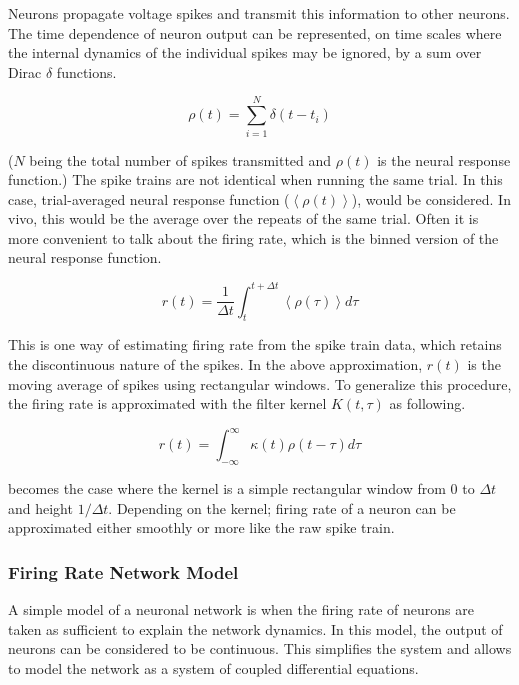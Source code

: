\documentclass[../dissertation.tex]{subfiles}
\begin{document}
Neurons propagate voltage spikes and transmit this information to other neurons.
The time dependence of neuron output can be represented, on time scales where the internal dynamics of the individual spikes may be ignored, by a sum over Dirac $\delta$ functions.

\begin{equation}
    \rho(t) = \sum_{i=1}^{N} \delta(t - t_{i})
\end{equation}

($N$ being the total number of spikes transmitted and $ρ(t)$ is the neural response function.)
The spike trains are not identical when running the same trial.
In this case, trial-averaged neural response function ($\left<ρ(t)\right>$), would be considered.
In vivo, this would be the average over the repeats of the same trial.
Often it is more convenient to talk about the firing rate, which is the binned version of the neural response function.

\begin{equation}
    \label{eqn:linFR}
    r(t) = \frac{1}{\Delta t} \int_{t}^{t + \Delta t}
    \left<ρ(\tau)\right> d \tau
\end{equation}

This is one way of estimating firing rate from the spike train data, which retains the discontinuous nature of the spikes.
In the above approximation, $r(t)$ is the moving average of spikes using rectangular windows.
To generalize this procedure, the firing rate is approximated with the filter kernel $K(t, \tau)$ as following.

\begin{equation}
    \label{eqn:FR}
    r(t) = \int_{-\infty}^{\infty}
    \kappa (t)
    \rho (t - \tau)
    d \tau
\end{equation}

 becomes the case where the kernel is a simple rectangular window from $0$ to $\Delta t$ and height $1/\Delta t$.
Depending on the kernel; firing rate of a neuron can be approximated either smoothly or more like the raw spike train.

\subsubsection{Firing Rate Network Model}

A simple model of a neuronal network is when the firing rate of neurons are taken as sufficient to explain the network dynamics.
In this model, the output of neurons can be considered to be continuous.
This simplifies the system and allows to model the network as a system of coupled differential equations.
\end{document}
